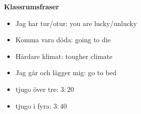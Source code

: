 
\begin{flushleft}
    \textbf{Klassrumsfraser}
    \begin{itemize}
        \item Jag har tur/otur: you are lucky/unlucky
        \item Komma vara döda: going to die
        \item Hårdare klimat: tougher climate
        \item Jag går och lägger mig: go to bed
        \item tjugo över tre: $3:20$
        \item tjugo i fyra: $3:40$
    \end{itemize}
\end{flushleft}

